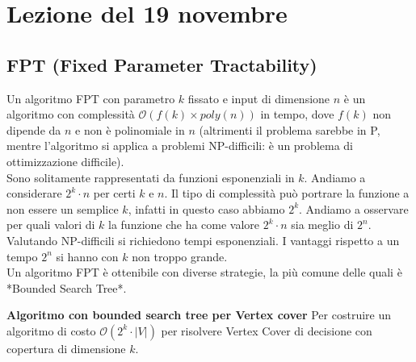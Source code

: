 \section{Lezione del 19 novembre}
\subsection{FPT (Fixed Parameter Tractability)}

Un algoritmo FPT con parametro $k$ fissato e input di dimensione $n$ è un algoritmo con complessità $\mathcal{O}(f(k) \times poly(n))$ in tempo, dove $f(k)$ non dipende da $n$ e non è polinomiale in $n$ (altrimenti il problema sarebbe in P, mentre l’algoritmo si applica a problemi NP-difficili: è un problema di ottimizzazione difficile). \\
Sono solitamente rappresentati da funzioni esponenziali in $k$. Andiamo a considerare $2^k \cdot n$ per certi $k$ e $n$. Il tipo di complessità può portrare la funzione a non essere un semplice $k$, infatti in questo caso abbiamo $2^k$. Andiamo a osservare per quali valori di $k$ la funzione che ha come valore $2^k \cdot n$ sia meglio di $2^n$. Valutando NP-difficili si richiedono tempi esponenziali. I vantaggi rispetto a un tempo $2^n$ si hanno con $k$ non troppo grande.\\

Un algoritmo FPT è ottenibile con diverse strategie, la più comune delle quali è *Bounded Search Tree*.

\textbf{Algoritmo con bounded search tree per Vertex cover}
Per costruire un algoritmo di costo $\mathcal{O}(2^k \cdot |V|)$ per risolvere Vertex Cover di decisione con copertura di dimensione $k$.

